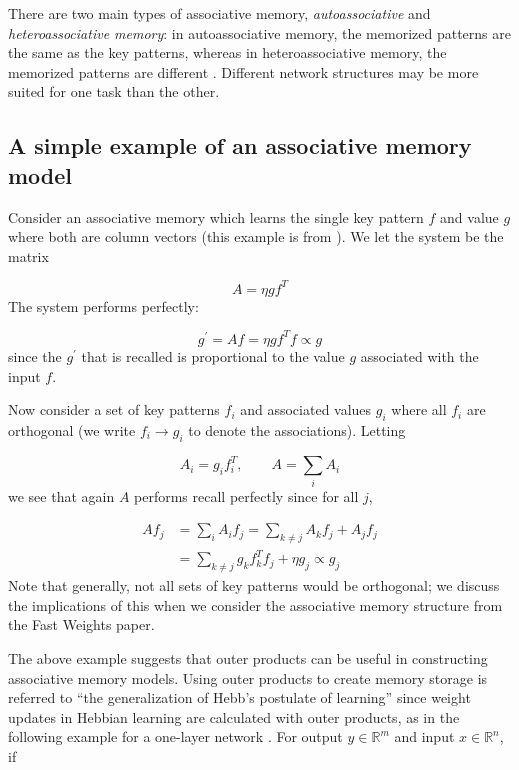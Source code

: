 There are two main types of associative memory, \emph{autoassociative} and \emph{heteroassociative memory}: in autoassociative memory, the memorized patterns are the same as the key patterns, whereas in heteroassociative memory, the memorized patterns are different \cite[p. 38]{Haykin:2009:NNC:1213811}. Different network structures may be more suited for one task than the other.

\subsection{A simple example of an associative memory model}

Consider an associative memory which learns the single key pattern $f$ and value $g$ where both are column vectors (this example is from \cite[p. 163-165]{Anderson95}). We let the system be the matrix

\begin{equation*}
A = \eta g f^T
\end{equation*}
%
The system performs perfectly:

\begin{equation*}
g^\prime = Af = \eta g f^T f \propto g
\end{equation*}
%
since the $g^\prime$ that is recalled is proportional to the value $g$ associated with the input $f$.

Now consider a set of key patterns $f_i$ and associated values $g_i$ where all $f_i$ are orthogonal (we write $f_i \rightarrow g_i$ to denote the associations). Letting

\begin{equation*}
A_i = g_i f_i^T, \qquad A = \sum_{i} A_i
\end{equation*}
%
we see that again $A$ performs recall perfectly since for all $j$,

\begin{align*}
  A f_j & = \sum_{i}A_i f_j = \sum_{k \neq j} A_k f_j + A_j f_j \\
  & = \sum_{k \neq j} g_k f_k^T f_j + \eta g_j \propto g_j
\end{align*}
%
Note that generally, not all sets of key patterns would be orthogonal; we discuss the implications of this when we consider the associative memory structure from the Fast Weights paper.

The above example suggests that outer products can be useful in constructing associative memory models. Using outer products to create memory storage is referred to ``the generalization of Hebb's postulate of learning'' \cite[p. 698]{Haykin:2009:NNC:1213811} since weight updates in Hebbian learning are calculated with outer products, as in the following example for a one-layer network \cite[p. 39-40]{fyfe2000}. For output $y \in \mathbb{R}^m$ and input $x \in \mathbb{R}^n$, if

